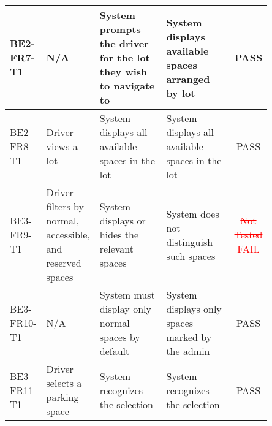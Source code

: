 \documentclass[12pt, titlepage]{article}
\begin{document}
\begin{center}
\begin{tabular}{|p{0.10\linewidth}|p{0.15\linewidth}|p{0.30\linewidth}|p{0.30\linewidth}|c|} 
\hline
BE2-FR7-T1 & N/A & System prompts the driver for the lot they wish to navigate
to & System displays available spaces arranged by lot &
\textcolor{OliveGreen}{PASS} \\
\hline
BE2-FR8-T1 & Driver views a lot & System displays all available spaces in the
lot & System displays all available spaces in the lot &
\textcolor{OliveGreen}{PASS} \\ 
\hline
BE3-FR9-T1 & Driver filters by normal, accessible, and reserved spaces & System
displays or hides the relevant spaces & System does not distinguish such spaces
& \textcolor{red}{\st{Not Tested} FAIL} \\
\hline
BE3-FR10-T1 & N/A & System must display only normal spaces by default & System
displays only spaces marked by the admin & \textcolor{OliveGreen}{PASS} \\
\hline
BE3-FR11-T1 & Driver selects a parking space & System recognizes the selection &
System recognizes the selection & \textcolor{OliveGreen}{PASS} \\
\hline
\end{tabular}
\end{center}
\end{document}
